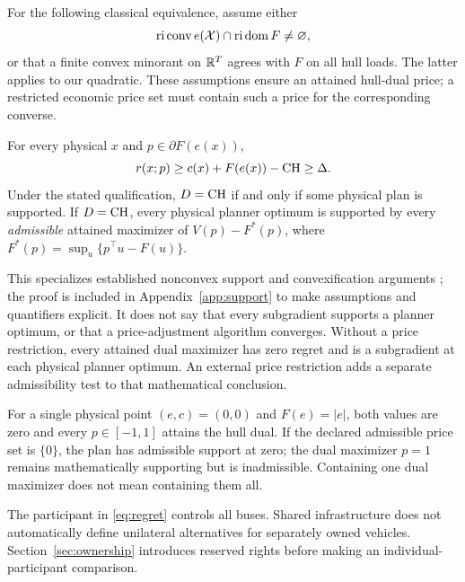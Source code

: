 For the following classical equivalence, assume either
\[
 \operatorname{ri}\operatorname{conv}e(\mathcal X)
 \cap\operatorname{ri}\operatorname{dom}F\ne\varnothing,
\]
or that a finite convex minorant on $\mathbb R^T$ agrees with $F$ on all hull
loads. The latter applies to our quadratic. These assumptions ensure an
attained hull-dual price; a restricted economic price set must contain such
a price for the corresponding converse.

\begin{proposition}\label{prop:support}
For every physical $x$ and $p\in\partial F(e(x))$,
\begin{equation}\label{eq:lower}
 r(x;p)\ge c(x)+F(e(x))-\mathrm{CH}\ge\Delta.
\end{equation}
Under the stated qualification, $D=\mathrm{CH}$ if and only if some physical plan
is supported. If $D=\mathrm{CH}$, every physical planner optimum is supported by
every \emph{admissible} attained maximizer of $V(p)-F^*(p)$, where
$F^*(p)=\sup_u\{p^\top u-F(u)\}$.
\end{proposition}
This specializes established nonconvex support and convexification
arguments \citep{oneill2005,gribikHoganPope2007,huaBaldick2017}; the proof
is included in Appendix~\ref{app:support} to make assumptions and quantifiers
explicit. It does not say that every subgradient supports a planner optimum,
or that a price-adjustment algorithm converges. Without a price restriction,
every attained dual maximizer has zero regret and is a subgradient at each
physical planner optimum. An external price restriction adds a separate
admissibility test to that mathematical conclusion.

\begin{remark}
For a single physical point $(e,c)=(0,0)$ and $F(e)=|e|$, both values
are zero and every $p\in[-1,1]$ attains the hull dual. If the declared
admissible price set is $\{0\}$, the plan has admissible support at zero;
the dual maximizer $p=1$ remains mathematically supporting but is inadmissible.
Containing one dual maximizer does not mean containing them all.
\end{remark}

The participant in \eqref{eq:regret} controls all buses. Shared infrastructure
does not automatically define unilateral alternatives for separately owned
vehicles. Section~\ref{sec:ownership} introduces reserved rights before
making an individual-participant comparison.
